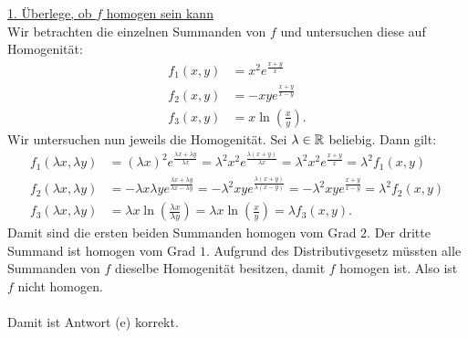 \underline{1. Überlege, ob $ f $ homogen sein kann}\\
Wir betrachten die einzelnen Summanden von $ f $ und untersuchen diese auf Homogenität:
\begin{align*}
	f_1(x,y)
	&=
	x^2 e^{\frac{x+y}{x}}\\
	f_2(x,y)
	&=
	-
	xy e^{\frac{x+y}{x-y}}\\
	f_3(x,y)
	&=
	x \ln \left( \frac{x}{y} \right).
\end{align*} 
Wir untersuchen nun jeweils die Homogenität.
Sei $ \lambda \in \mathbb{R} $ beliebig. Dann gilt:
\begin{align*}
	f_1(\lambda x, \lambda y)
	&=
	(\lambda x)^2 e^{\frac{\lambda x+ \lambda y} { \lambda x}}
	=
	\lambda^2 x^2 e^{\frac{\lambda( x+  y) } { \lambda x}}
	=
	\lambda^2 x^2 e^{\frac{x+y}{x}} 
	= \lambda^2 f_1(x,y)
	\\
	f_2(\lambda x, \lambda y)
	&=
	-
	\lambda x \lambda y e^{\frac{\lambda x+ \lambda y}{ \lambda x- \lambda y}}
	=
	-
	\lambda^2 xy e^{\frac{\lambda (x+  y)}{ \lambda (x-  y)}}
	=
	-
	\lambda^2 xy e^{\frac{x+  y}{  x-  y}}
	=
	\lambda^2 f_2(x,y)\\
	f_3(\lambda x, \lambda y)
	&=
	\lambda x \ln \left( \frac{\lambda x}{ \lambda y} \right)
	=
	\lambda x \ln \left( \frac{ x}{ y} \right)
	=
	\lambda f_3(x,y).
\end{align*}
Damit sind die ersten beiden Summanden homogen vom Grad $ 2 $.
Der dritte Summand ist homogen vom Grad $ 1 $. Aufgrund des Distributivgesetz müssten alle Summanden von $ f $ dieselbe Homogenität besitzen, damit $ f $ homogen ist. Also ist $ f $ nicht homogen.\\
\\
Damit ist Antwort (e) korrekt.


\newpage


